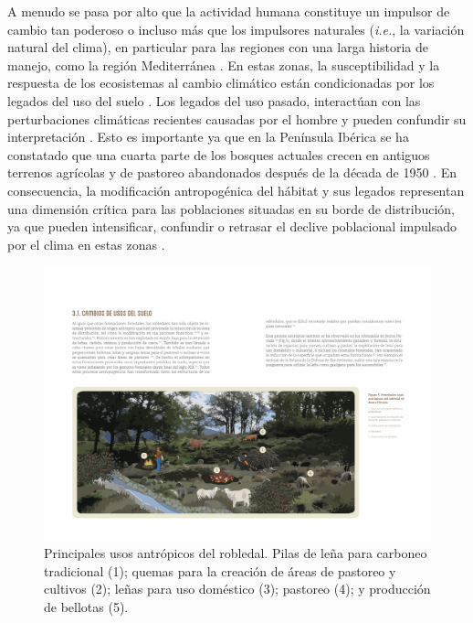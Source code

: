 A menudo se pasa por alto que la actividad humana constituye un impulsor de cambio tan poderoso o incluso más que los impulsores naturales (\emph{i.e.}, la variación natural del clima), en particular para las regiones con una larga historia de manejo, como la región Mediterránea \autocites{NavarroGonzalezetal2013WeightLanduse,DoblasMirandaetal2017ReviewCombination}. En estas zonas, la susceptibilidad y la respuesta de los ecosistemas al cambio climático están condicionadas por los legados del uso del suelo \autocites{Munteanuetal2015Legacies19th,Mausolfetal2018LegacyEffects}. Los legados del uso pasado, interactúan con las perturbaciones climáticas recientes causadas por el hombre y pueden confundir su interpretación \autocite{Fosteretal2003ImportanceLanduse}. Esto es importante ya que en la Península Ibérica se ha constatado que una cuarta parte de los bosques actuales crecen en antiguos terrenos agrícolas y de pastoreo abandonados después de la década de 1950 \autocite{VilaCabreraetal2017NewForests}. En consecuencia, la modificación antropogénica del hábitat y sus legados representan una dimensión crítica para las poblaciones situadas en su borde de distribución, ya que pueden intensificar, confundir o retrasar el declive poblacional impulsado por el clima en estas zonas \autocites{VilaCabreraJump2019GreaterGrowtha,SanchezdeDiosetal2020FagusSylvatica}. 
\begin{figure}[H]
	\centering
	\includegraphics[width=\textwidth]{img/intro/intro-usos.pdf} \caption{Principales usos antrópicos del robledal. Pilas de leña para carboneo tradicional (1); quemas para la creación de áreas de pastoreo y cultivos (2); leñas para uso doméstico (3); pastoreo (4); y producción de bellotas (5).}\label{fig:intro:usos}
\end{figure}

